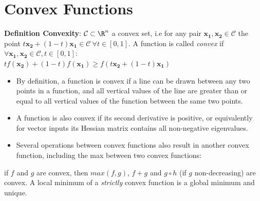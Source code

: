 \documentclass[english]{latex4ei/latex4ei_sheet}
\begin{document}
\section{Convex Functions}
\begin{sectionbox}
\begin{emphbox}
    \textbf{Definition Convexity}: $\mathcal{C}\subset\R^n$ a convex set, i.e for any pair $\mathbf{x_1,x_2}\in\mathcal{C}$ the point $t\mathbf{x_2}+(1-t)\mathbf{x_1} \in \mathcal{C} \ \forall t\in[0,1]$. A function is called \emph{convex} if $\forall \mathbf{x_1,x_2}\in \mathcal{C}, t\in[0,1]$:\\
    $tf(\mathbf{x_2})+(1-t)f(\mathbf{x_1}) \ge f(t\mathbf{x_2}+(1-t)\mathbf{x_1}) $
\end{emphbox}
\begin{itemize}
\item By definition, a function is convex if a line can be drawn between any two points in a function, and all vertical values of the line are greater than or equal to all vertical values of the function between the same two points.
\item A function is also convex if its second derivative is positive, or equivalently for vector inputs its Hessian matrix contains all non-negative eigenvalues.
\item Several operations between convex functions also result in another convex function, including the max between two convex functions:
\end{itemize}
\begin{emphbox}
    if $f$ and $g$ are convex, then $max(f,g)$, $f+g$ and $g\circ h$ (if $g$ non-decreasing) are convex. A local minimum of a \emph{strictly} convex function is a global minimum and unique.
\end{emphbox}
\end{sectionbox}
\vspace{50}
\end{document}
